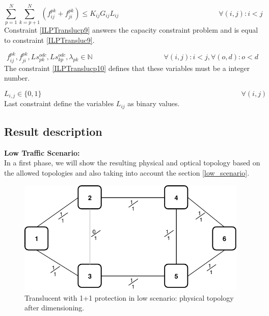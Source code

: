 \begin{equation}
\sum_{p=1}^{N} \sum_{k=p+1}^{N} \left( f_{ij}^{pk} + f_{ji}^{pk}\right) \leq K_{ij} G_{ij} L_{ij} \qquad \qquad \qquad \qquad \qquad \qquad \qquad
\forall (i,j) : i < j
\label{ILPTranslucp9}
\end{equation}
\noindent
Constraint \ref{ILPTranslucp9} answers the capacity constraint problem and is equal to constraint \ref{ILPTransluc9}.

\begin{equation}
f_{ij}^{pk} , f_{ji}^{pk} , Ls_{pk}^{odc} , Ls_{kp}^{odc} , \lambda_{pk} \in \mathbb{N}   \qquad \qquad \qquad \qquad \qquad
\forall(i,j) : i < j, \forall(o,d) : o < d
\label{ILPTranslucp10}
\end{equation}
\noindent
The constraint \ref{ILPTranslucp10} defines that these variables must be a integer number.

\begin{equation}
L_{i,j} \in \{0,1\} \qquad \qquad \qquad \qquad \qquad \qquad \qquad \qquad \qquad \qquad \qquad \qquad \qquad \qquad
\forall(i,j)
\label{ILPTransluc11}
\end{equation}
\noindent
Last constraint define the variables $L_{ij}$ as binary values.\\

\subsection{Result description}

\textbf{Low Traffic Scenario:}\\

In a first phase, we will show the resulting physical and optical topology based on the allowed topologies and also taking into account the section \ref{low_scenario}.

\begin{figure}[h!]
\centering
\includegraphics[width=11cm]{sdf/ilp/translucent_protection/figures/physical_topology_low}
\caption{Translucent with 1+1 protection in low scenario: physical topology after dimensioning.}
\label{physical3_protectionlow}
\end{figure}

